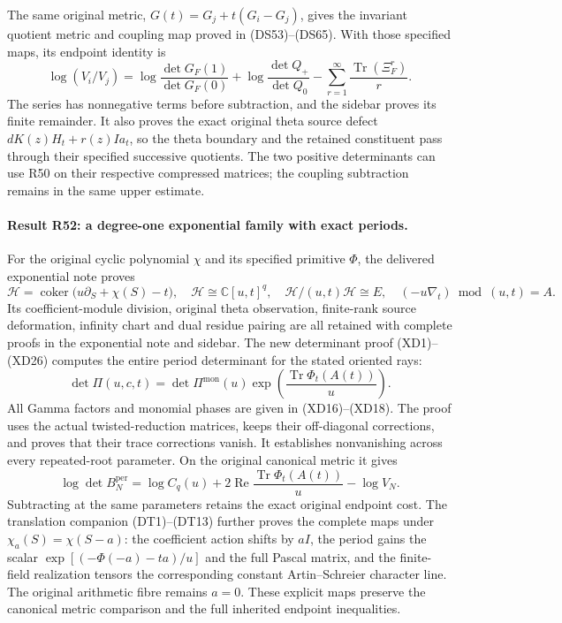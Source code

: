 The same original metric, \(G(t)=G_j+t(G_i-G_j)\), gives the invariant
quotient metric and coupling map proved in (DS53)--(DS65). With those
specified maps, its endpoint identity is
\[
 \log(V_i/V_j)=
 \log\frac{\det G_F(1)}{\det G_F(0)}
 +\log\frac{\det Q_+}{\det Q_0}
 -\sum_{r=1}^{\infty}\frac{\operatorname{Tr}(\Xi_F^r)}r.
\]
The series has nonnegative terms before subtraction, and the sidebar
proves its finite remainder. It also proves the exact original theta
source defect
\(dK(z)H_t+r(z)Ia_t\), so the theta boundary and the retained
constituent pass through their specified successive quotients.
The two positive determinants can use R50 on their respective
compressed matrices; the coupling subtraction remains in the same
upper estimate.

\paragraph{Result R52: a degree-one exponential family with exact periods.}
For the original cyclic polynomial \(\chi\) and its specified primitive
\(\Phi\), the delivered exponential note proves
\[
 \mathcal H=\operatorname{coker}
 \bigl(u\partial_S+\chi(S)-t\bigr),\quad
 \mathcal H\cong\mathbb C[u,t]^q,\quad
 \mathcal H/(u,t)\mathcal H\cong E,
 \quad(-u\nabla_t)\bmod(u,t)=A.
\]
Its coefficient-module division, original theta observation,
finite-rank source deformation, infinity chart and dual residue
pairing are all retained with complete proofs in the exponential
note and sidebar. The new determinant proof (XD1)--(XD26) computes
the entire period determinant for the stated oriented rays:
\[
 \det\Pi(u,c,t)=\det\Pi^{\mathrm{mon}}(u)
       \exp\!\left(\frac{\operatorname{Tr}\Phi_t(A(t))}{u}\right).
\]
All Gamma factors and monomial phases are given in (XD16)--(XD18).
The proof uses the actual twisted-reduction matrices, keeps their
off-diagonal corrections, and proves that their trace corrections
vanish. It establishes nonvanishing across every repeated-root
parameter. On the original canonical metric it gives
\[
 \log\det B_N^{\mathrm{per}}=
 \log C_q(u)+2\operatorname{Re}
       \frac{\operatorname{Tr}\Phi_t(A(t))}{u}-\log V_N.
\]
Subtracting at the same parameters retains the exact original
endpoint cost. The translation companion (DT1)--(DT13) further
proves the complete maps under \(\chi_a(S)=\chi(S-a)\): the
coefficient action shifts by \(aI\), the period gains the scalar
\(\exp[(-\Phi(-a)-ta)/u]\) and the full Pascal matrix, and the
finite-field realization tensors the corresponding constant
Artin--Schreier character line. The original arithmetic fibre
remains \(a=0\). These explicit maps preserve the canonical metric
comparison and the full inherited endpoint inequalities.
